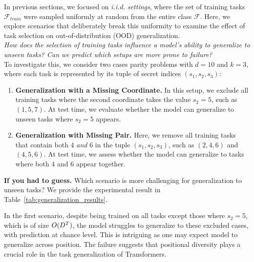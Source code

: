 In previous sections, we focused on \textit{i.i.d. settings}, where the set of training tasks $\mathcal{F}_{train}$ were sampled uniformly at random from the entire class $\mathcal{F}$. Here, we explore scenarios that deliberately break this uniformity to examine the effect of task selection on out-of-distribution (OOD) generalization.\\

\textit{How does the selection of training tasks influence a model’s ability to generalize to unseen tasks? Can we predict which setups are more prone to failure?}\\

\noindent To investigate this, we consider two cases parity problems with \( d = 10 \) and \( k = 3 \), where each task is represented by its tuple of secret indices \( (s_1, s_2, s_3) \):

\begin{enumerate}[leftmargin=0.4 cm]
    \item \textbf{Generalization with a Missing Coordinate.} In this setup, we exclude all training tasks where the second coordinate takes the value \( s_2 = 5 \), such as \( (1,5,7) \). At test time, we evaluate whether the model can generalize to unseen tasks where \( s_2 = 5 \) appears.
    \item \textbf{Generalization with Missing Pair.} Here, we remove all training tasks that contain both \( 4 \) \textit{and} \( 6 \) in the tuple \( (s_1, s_2, s_3) \), such as \( (2,4,6) \) and \( (4,5,6) \). At test time, we assess whether the model can generalize to tasks where both \( 4 \) and \( 6 \) appear together.
\end{enumerate}

\noindent \textbf{If you had to guess.} Which scenario is more challenging for generalization to unseen tasks? We provide the experimental result in Table~\ref{tab:generalization_results}.



In the first scenario, despite being trained on all tasks except those where \( s_2 = 5 \), which is of size $O(D^T)$, the model struggles to generalize to these excluded cases, with prediction at chance level. This is intriguing as one may expect model to generalize across position. The failure  suggests that positional diversity plays a crucial role in the task generalization of Transformers. 

